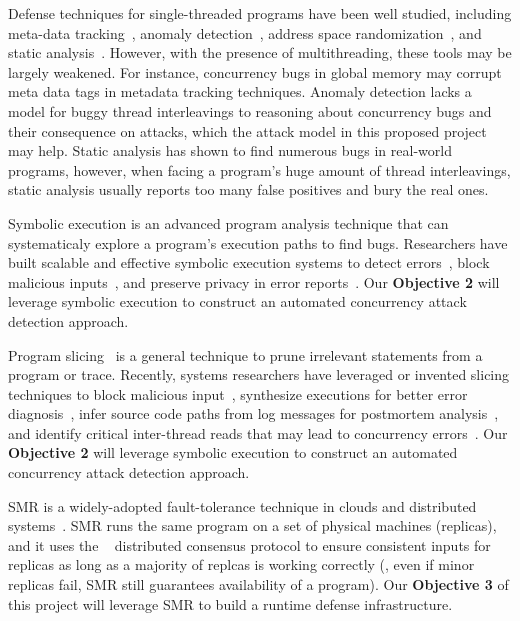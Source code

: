  Defense techniques for 
single-threaded programs have been well studied, including meta-data 
tracking~\cite{taintdroid:osdi10, lift:micro06, myers:information, 
valgrind:pldi}, anomaly 
detection~\cite{taskrecycling:ppopp90,schonberg:pldi89}, address space 
randomization~\cite{ aslr-fail:ccs04}, and static 
analysis~\cite{seth:pldi,engler:vmcai,wagner:syscall:ids,coverity:cacm, 
klee:osdi08}. However, with the presence of 
multithreading, these tools may be largely weakened. For instance, concurrency 
bugs in global memory may corrupt meta data tags in metadata tracking 
techniques. Anomaly detection lacks a model for buggy thread interleavings to 
reasoning about concurrency bugs and their consequence on attacks, which the 
attack model in this proposed project may help. Static analysis has shown to 
find numerous bugs in real-world programs, however, when facing a program's 
huge amount of thread interleavings, static analysis usually reports too many 
false positives and bury the real ones.

 Symbolic execution is an advanced program 
analysis technique that can systematicaly explore a program's execution paths 
to find bugs.  Researchers have built
scalable and effective symbolic execution systems to detect
errors~\cite{dart:pldi,cute:fse,godefroid:grammar-fuzzing,
godefroid:whitebox-fuzzing,
klee:osdi08,yang:malicious-disk:oakland06,cadar:exe:ccs06,s2e:hotdep09,
taas:socc10}, block malicious inputs~\cite{castro:bouncer}, and preserve 
privacy in error reports~\cite{castro:bug-report-privacy}. Our 
\textbf{Objective 2} will leverage symbolic execution to construct an automated 
concurrency attack detection approach.

  Program slicing~\cite{Tip:slicing} is a general
technique to prune irrelevant statements from a program or trace.
Recently, systems researchers have leveraged or invented slicing
techniques to block malicious input~\cite{castro:bouncer}, synthesize
executions for better error diagnosis~\cite{esd:eurosys10}, infer source
code paths from log messages for postmortem analysis~\cite{sherlog:asplos10}, 
and identify critical inter-thread reads that may lead to concurrency 
errors~\cite{conseq:asplos11}. Our \textbf{Objective 2} will leverage symbolic 
execution to construct an automated concurrency attack detection approach.

  SMR is a widely-adopted 
fault-tolerance technique in clouds and distributed 
systems~\cite{lamportclock,smr:tutorial}. SMR runs the same program on a set of 
physical machines (replicas), and it uses the 
\paxos~\cite{paxos,paxos:simple,paxos:complex} distributed consensus protocol 
to ensure consistent inputs for replicas as long as a majority of replcas is 
working correctly (\ie, even if minor replicas fail, SMR still guarantees 
availability of a program). Our \textbf{Objective 3} of this project will 
leverage SMR to build a runtime defense infrastructure.


